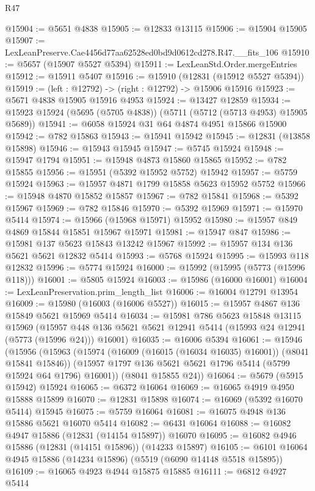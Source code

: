 \begin{lexlean}{R47}
\begin{coremodule}
@15904 := @5651 @4838
@15905 := @12833 @13115
@15906 := @15904 @15905
@15907 := LexLeanPreserve.Cae4456d77aa62528ed0bd9d0612cd278.R47.__fits_106
@15910 := @5657 (@15907 @5527 @5394)
@15911 := LexLeanStd.Order.mergeEntries
@15912 := @15911 @5407
@15916 := @15910 (@12831 (@15912 @5527 @5394))
@15919 := (left : @12792) -> (right : @12792) -> @15906 @15916
@15923 := @5671 @4838 @15905 @15916 @4953
@15924 := @13427 @12859
@15934 := @15923 @15924 (@5695 (@5705 @4838)) (@5711 (@5712 (@5713 @4953) @15905 @5689))
@15941 := @6058 @15924 @31 @64 @4874 @4951 @15866 @15900
@15942 := @782 @15863
@15943 := @15941 @15942
@15945 := @12831 (@13858 @15898)
@15946 := @15943 @15945
@15947 := @5745 @15924
@15948 := @15947 @1794
@15951 := @15948 @4873 @15860 @15865
@15952 := @782 @15855
@15956 := @15951 (@5392 @15952 @5752) @15942
@15957 := @5759 @15924
@15963 := @15957 @4871 @1799 @15858 @5623 @15952 @5752
@15966 := @15948 @4870 @15852 @15857
@15967 := @782 @15841
@15968 := @5392 @15967
@15969 := @782 @15846
@15970 := @5392 @15969
@15971 := @15970 @5414
@15974 := @15966 (@15968 @15971) @15952
@15980 := @15957 @849 @4869 @15844 @15851 @15967 @15971
@15981 := @15947 @847
@15986 := @15981 @137 @5623 @15843 @13242 @15967
@15992 := @15957 @134 @136 @5621 @5621 @12832 @5414
@15993 := @5768 @15924
@15995 := @15993 @118 @12832
@15996 := @5774 @15924
@16000 := @15992 (@15995 (@5773 (@15996 @118)))
@16001 := @5805 @15924
@16003 := @15986 (@16000 @16001)
@16004 := LexLeanPreservation.prim_length_list
@16006 := @16004 @12791 @13954
@16009 := @15980 (@16003 (@16006 @5527))
@16015 := @15957 @4867 @136 @15849 @5621 @15969 @5414
@16034 := @15981
    @786
    @5623
    @15848
    @13115
    @15969
    (@15957 @448 @136 @5621 @5621 @12941 @5414 (@15993 @24 @12941 (@5773 (@15996 @24))) @16001)
@16035 := @16006 @5394
@16061 := @15946
    (@15956
      (@15963
        (@15974 (@16009 (@16015 (@16034 @16035) @16001)) (@8041 @15841 @15846))
        (@15957 @1797 @136 @5621 @5621 @1796 @5414 (@5799 @15924 @64 @1796) @16001))
      (@8041 @15855 @24))
@16064 := @5679 (@5915 @15942) @15924
@16065 := @6372 @16064
@16069 := @16065 @4919 @4950 @15888 @15899
@16070 := @12831 @15898
@16074 := @16069 (@5392 @16070 @5414) @15945
@16075 := @5759 @16064
@16081 := @16075 @4948 @136 @15886 @5621 @16070 @5414
@16082 := @6431 @16064
@16088 := @16082 @4947 @15886 (@12831 (@14154 @15897)) @16070
@16095 := @16082 @4946 @15886 (@12831 (@14151 @15896)) (@14233 @15897)
@16105 := @6101 @16064 @4945 @15886 (@14234 @15896) (@5519 (@6090 @14148 @5518 @15895))
@16109 := @16065 @4923 @4944 @15875 @15885
@16111 := @6812 @4927 @5414

\end{coremodule}
\end{lexlean}
